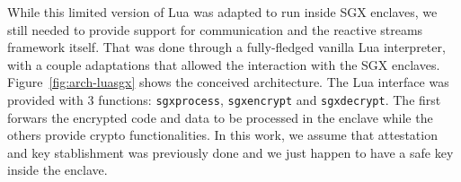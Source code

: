 While this limited version of Lua was adapted to run inside SGX enclaves, we still needed to provide support for communication and the reactive streams framework itself.
That was done through a fully-fledged vanilla Lua interpreter, with a couple adaptations that allowed the interaction with the SGX enclaves.
Figure~\ref{fig:arch-luasgx} shows the conceived architecture.
The Lua interface was provided with 3 functions: \texttt{sgxprocess}, \texttt{sgxencrypt} and \texttt{sgxdecrypt}. The first forwars the encrypted code and data to be processed in the enclave while the others provide crypto functionalities.
In this work, we assume that attestation and key stablishment was previously done and we just happen to have a safe key inside the enclave.


